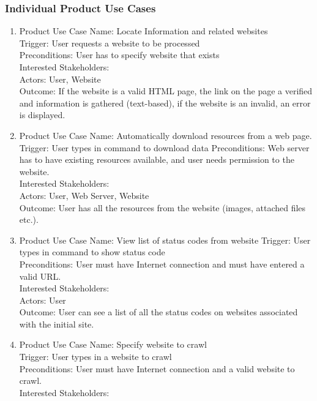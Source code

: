 \documentclass[titlepage]{article}
\begin{document}
\subsubsection*{Individual Product Use Cases  }
\begin{enumerate}
  \item  Product Use Case Name: Locate Information and related websites \\
  Trigger: User requests a website to be processed \\
Preconditions: User has to specify website that exists\\
Interested Stakeholders: \\
Actors: User, Website\\
Outcome: If the website is a valid HTML page, the link on the page a verified and information is gathered (text-based), if the website is an invalid, an error is displayed.\\
  \item Product Use Case Name: Automatically download resources from a web page.\\
  Trigger: User types in command to download data
Preconditions: Web server has to have existing resources available, and user needs permission to the website.\\
Interested Stakeholders: \\
Actors: User, Web Server, Website\\
Outcome: User has all the resources from the website (images, attached files etc.).\\
  \item Product Use Case Name: View list of status codes from website
  Trigger: User types in command to show status code\\
Preconditions: User must have Internet connection and must have entered a valid URL.\\
Interested Stakeholders: \\
Actors: User\\
Outcome: User can see a list of all the status codes on websites associated with the initial site.\\
  \item Product Use Case Name: Specify website to crawl\\
Trigger: User types in a website to crawl\\
Preconditions: User must have Internet connection and a valid website to crawl.\\
Interested Stakeholders:\\

\end{enumerate}
\end{document}
